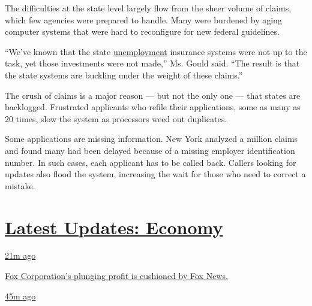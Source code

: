 The difficulties at the state level largely flow from the sheer volume
of claims, which few agencies were prepared to handle. Many were
burdened by aging computer systems that were hard to reconfigure for new
federal guidelines.

``We've known that the state
\href{https://www.nytimes3xbfgragh.onion/2020/05/28/business/economy/coronavirus-unemployment-claims.html}{unemployment}
insurance systems were not up to the task, yet those investments were
not made,'' Ms. Gould said. ``The result is that the state systems are
buckling under the weight of these claims.''

The crush of claims is a major reason --- but not the only one --- that
states are backlogged. Frustrated applicants who refile their
applications, some as many as 20 times, slow the system as processors
weed out duplicates.

Some applications are missing information. New York analyzed a million
claims and found many had been delayed because of a missing employer
identification number. In such cases, each applicant has to be called
back. Callers looking for updates also flood the system, increasing the
wait for those who need to correct a mistake.

\hypertarget{latest-updates-economy}{%
\section{\texorpdfstring{\href{https://www.nytimes3xbfgragh.onion/live/2020/08/04/business/stock-market-today-coronavirus?action=click\&pgtype=Article\&state=default\&region=MAIN_CONTENT_1\&context=storylines_live_updates}{Latest
Updates:
Economy}}{Latest Updates: Economy}}\label{latest-updates-economy}}

\href{https://www.nytimes3xbfgragh.onion/live/2020/08/04/business/stock-market-today-coronavirus?action=click\&pgtype=Article\&state=default\&region=MAIN_CONTENT_1\&context=storylines_live_updates\#fox-corporations-plunging-profit-is-cushioned-by-fox-news}{21m
ago}

\href{https://www.nytimes3xbfgragh.onion/live/2020/08/04/business/stock-market-today-coronavirus?action=click\&pgtype=Article\&state=default\&region=MAIN_CONTENT_1\&context=storylines_live_updates\#fox-corporations-plunging-profit-is-cushioned-by-fox-news}{Fox
Corporation's plunging profit is cushioned by Fox News.}

\href{https://www.nytimes3xbfgragh.onion/live/2020/08/04/business/stock-market-today-coronavirus?action=click\&pgtype=Article\&state=default\&region=MAIN_CONTENT_1\&context=storylines_live_updates\#trading-in-kodak-shares-comes-under-scrutiny}{45m
ago}

